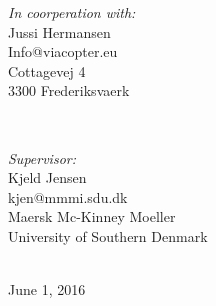 \begin{titlepage}
\begin{minipage}{0.4\textwidth}
\begin{flushleft} \large
\emph{In coorperation with:}\\
Jussi Hermansen \\
Info@viacopter.eu \\
Cottagevej 4  \\
3300 Frederiksvaerk \\
\end{flushleft}
\end{minipage}
~
\begin{minipage}{0.4\textwidth}
\begin{flushright} \large
\emph{Supervisor:} \\
Kjeld Jensen \\ %
kjen@mmmi.sdu.dk \\
Maersk Mc-Kinney Moeller \\
University of Southern Denmark
\end{flushright}
\end{minipage}\\[4cm]




{\large June 1, 2016}\\[3cm] %


 

\vfill %

\end{titlepage}